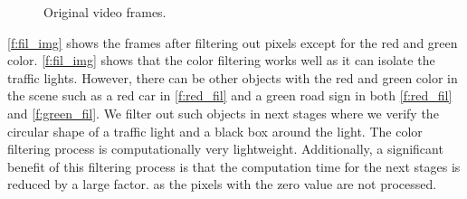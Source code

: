 \begin{figure}[!ht]
\centering
{}
\hfill
{}
\caption{Original video frames.}
\label{f:org_img}
\end{figure}


\ref{f:fil_img} shows the frames after filtering out pixels except for the red and green color. 
\ref{f:fil_img} shows that the color filtering works well as it can isolate the traffic lights. 
However, there can be other objects with the red and green color in the scene such as a red car in \ref{f:red_fil} and a green road sign in both \ref{f:red_fil} and \ref{f:green_fil}.
We filter out such objects in next stages where we verify the circular shape of a traffic light and a black box around the light.
The color filtering process is computationally very lightweight.
Additionally, a significant benefit of this filtering process is that the computation time for the next stages is reduced by a large factor.
as the pixels with the zero value are not processed.



